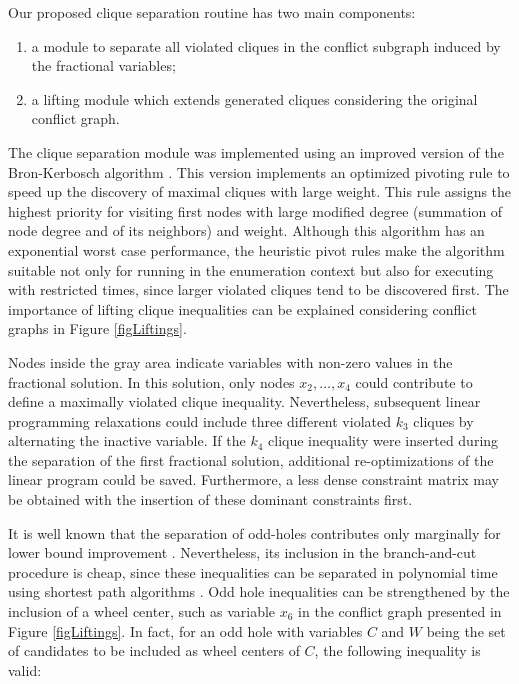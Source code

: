 \documentclass{endm}
\begin{document}
Our proposed clique separation routine has two main components:  \begin{enumerate} \item a module to separate all violated cliques in the conflict subgraph induced by the fractional variables; \item a lifting module which extends generated cliques considering the original conflict graph. \end{enumerate}  The clique separation module was implemented using an improved version of the Bron-Kerbosch algorithm \cite{Bron1973}. This version implements an optimized pivoting rule \cite{Brito2011} to speed up the discovery of maximal cliques with large weight. This rule assigns the highest priority for visiting first nodes with large modified degree (summation of node degree and of its neighbors) and weight. Although this algorithm has an exponential worst case performance, the heuristic pivot rules  make the algorithm suitable not only for running in the enumeration context but also for executing with restricted times, since larger violated cliques tend to be discovered first. The importance of lifting clique inequalities can be explained considering conflict graphs in Figure \ref{figLiftings}. 

Nodes inside the gray area indicate variables with non-zero values in the fractional solution. In this solution, only nodes $x_{2},\ldots,x_{4}$ could contribute to define a maximally violated clique inequality. Nevertheless, subsequent linear programming relaxations could include three different violated $k_{3}$ cliques by alternating the inactive variable. If the $k_{4}$ clique inequality were inserted during the separation of the first fractional solution, additional re-optimizations of the linear program could be saved. Furthermore, a less dense constraint matrix may be obtained with the insertion of these dominant constraints first.


It is well known that the separation of odd-holes contributes only marginally for lower bound improvement \cite{Borndorfer1998,Mendez-Diaz2008}. Nevertheless, its inclusion in the branch-and-cut procedure is cheap, since these inequalities can be separated in polynomial time using shortest path algorithms \cite{Grotschel1993}. Odd hole inequalities can be strengthened by the inclusion of a wheel center, such as variable $x_{6}$ in the conflict graph presented in Figure \ref{figLiftings}. In fact, for an odd hole with variables $C$ and $W$ being the set of candidates to be included as wheel centers of $C$, the following inequality is valid:
\end{document}
